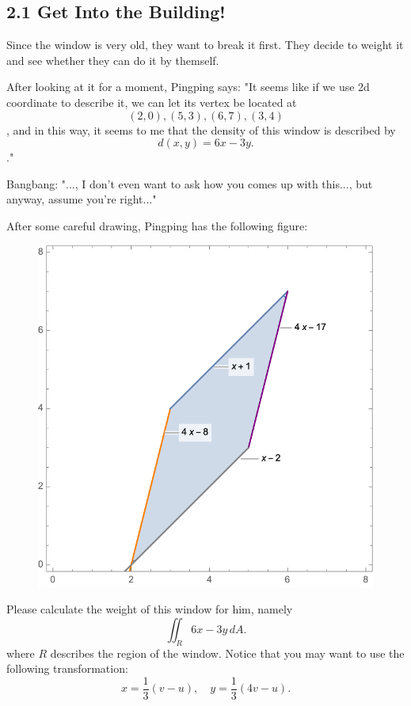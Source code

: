 \documentclass[12pt]{article}
\begin{document}
\subsection*{2.1 Get Into the Building!}
\par Since the window is very old, they want to break it first. They decide to weight it and see whether 
they can do it by themself. 

\par After looking at it for a moment, Pingping says: "It seems like if we use 2d coordinate to describe it, we can 
let its vertex be located at
\begin{equation*}
    (2,0), (5,3), (6,7), (3,4)
\end{equation*}
, and in this way, it seems to me that the density of this window is described by 
\begin{equation*}
    d(x,y) = 6x-3y.
\end{equation*}
." 
\par Bangbang: "..., I don't even want to ask how you comes up with this..., but anyway, assume you're right..."

\par After some careful drawing, Pingping has the following figure:
\begin{figure}[H]
    \centering
    \includegraphics[width = 0.7\linewidth]{Figure/2.1.png}
\end{figure}

\par Please calculate the weight of this window for him, namely 
\begin{equation*}
    \iint_R 6x-3y \,dA.
\end{equation*}
where $R$ describes the region of the window. Notice that you may want to use the following transformation:
\begin{equation*}
    x = \frac{1}{3}(v - u), \quad y = \frac{1}{3}(4v - u).
\end{equation*}
\end{document}
